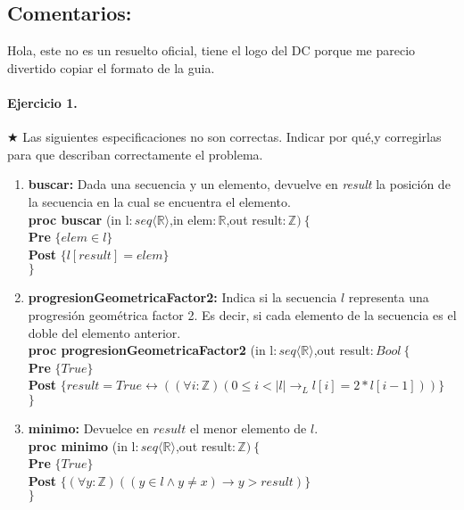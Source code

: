 \documentclass[a4paper]{article}
\begin{document}

\subsection*{Comentarios:}
Hola, este no es un resuelto oficial, tiene el logo del DC porque me parecio divertido copiar el formato de la guia.\\

\paragraph*{Ejercicio 1.}$\bigstar$ Las siguientes especificaciones no son correctas. Indicar por qué,y corregirlas para que describan correctamente el problema.
	\begin{enumerate}[label=\alph*)]
		\item \textbf{buscar:} Dada una secuencia y un elemento, devuelve en \textit{result} la posición de la secuencia en la cual se encuentra el elemento.\vspace{6mm} \\
		\textbf{proc buscar }(in l$:seq\langle \mathbb{R}\rangle$,in elem$:\mathbb{R}$,out result$:\mathbb{Z})\ \{$\smallskip \\
		\hspace*{6mm} \textbf{Pre }$\{ elem \in l\}$\smallskip \\
		\hspace*{6mm} \textbf{Post }$\{l[result]=elem\}$\\
		$\}$
		\item \textbf{progresionGeometricaFactor2:} Indica si la secuencia $l$ representa una progresión geométrica factor 2. Es decir, si cada elemento de la secuencia es el doble del elemento anterior.\vspace{6mm} \\
		\textbf{proc progresionGeometricaFactor2 }(in l$:seq\langle \mathbb{R}\rangle$,out result$:Bool\ \{$\smallskip \\
		\hspace*{6mm} \textbf{Pre }$\{ True\}$\smallskip \\
		\hspace*{6mm} \textbf{Post }$\{result=True\leftrightarrow ((\forall i:\mathbb{Z})(0\leq i < |l|\rightarrow_L l[i]=2*l[i-1]))\}$\\
		$\}$
		\item \textbf{minimo:} Devuelce en $result$ el menor elemento de $l$.\vspace{6mm} \\
		\textbf{proc minimo }(in l$:seq\langle \mathbb{R}\rangle$,out result$:\mathbb{Z})\ \{$\smallskip \\
		\hspace*{6mm} \textbf{Pre }$\{ True\}$\smallskip \\
		\hspace*{6mm} \textbf{Post }$\{(\forall y:\mathbb{Z})((y\in l \wedge y \neq x)\rightarrow y > result)\}$\\
		$\}$
	\end{enumerate}
\end{document}
